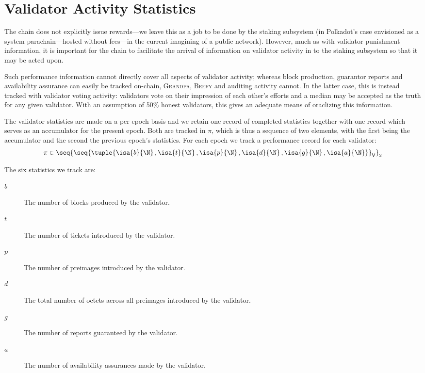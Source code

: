 \section{Validator Activity Statistics}\label{sec:bookkeeping}

The \Jam chain does not explicitly issue rewards---we leave this as a job to be done by the staking subsystem (in Polkadot's case envisioned as a system parachain---hosted without fees---in the current imagining of a public \Jam network). However, much as with validator punishment information, it is important for the \Jam chain to facilitate the arrival of information on validator activity in to the staking subsystem so that it may be acted upon.

Such performance information cannot directly cover all aspects of validator activity; whereas block production, guarantor reports and availability assurance can easily be tracked on-chain, \textsc{Grandpa}, \textsc{Beefy} and auditing activity cannot. In the latter case, this is instead tracked with validator voting activity: validators vote on their impression of each other's efforts and a median may be accepted as the truth for any given validator. With an assumption of 50\% honest validators, this gives an adequate means of oraclizing this information.

The validator statistics are made on a per-epoch basis and we retain one record of completed statistics together with one record which serves as an accumulator for the present epoch. Both are tracked in $\pi$, which is thus a sequence of two elements, with the first being the accumulator and the second the previous epoch's statistics. For each epoch we track a performance record for each validator:
\begin{equation}
  \pi \in \seq{\seq{\tuple{
    \isa{b}{\N}\,,
    \isa{t}{\N}\,,
    \isa{p}{\N}\,,
    \isa{d}{\N}\,,
    \isa{g}{\N}\,,
    \isa{a}{\N}
  }}_\mathsf{V}}_2
\end{equation}

The six statistics we track are:
\begin{description}
  \item[$b$] The number of blocks produced by the validator.
  \item[$t$] The number of tickets introduced by the validator.
  \item[$p$] The number of preimages introduced by the validator.
  \item[$d$] The total number of octets across all preimages introduced by the validator.
  \item[$g$] The number of reports guaranteed by the validator.
  \item[$a$] The number of availability assurances made by the validator.
\end{description}

